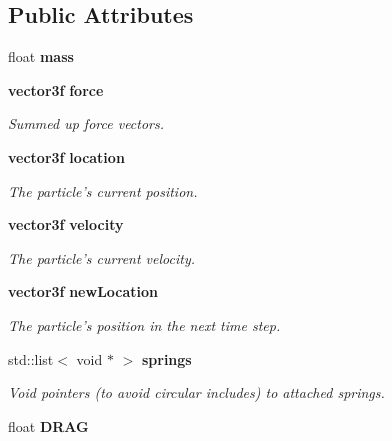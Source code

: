 \subsection*{Public Attributes}
\begin{CompactItemize}
\item 
{}
float {\bf mass}\label{classpointMass_m0}

\item 
{}
{\bf vector3f} {\bf force}\label{classpointMass_m1}

\begin{CompactList}\small\item\em Summed up force vectors.\item\end{CompactList}\item 
{}
{\bf vector3f} {\bf location}\label{classpointMass_m2}

\begin{CompactList}\small\item\em The particle's current position.\item\end{CompactList}\item 
{}
{\bf vector3f} {\bf velocity}\label{classpointMass_m3}

\begin{CompactList}\small\item\em The particle's current velocity.\item\end{CompactList}\item 
{}
{\bf vector3f} {\bf new\-Location}\label{classpointMass_m4}

\begin{CompactList}\small\item\em The particle's position in the next time step.\item\end{CompactList}\item 
{}
std::list$<$ void $\ast$ $>$ {\bf springs}\label{classpointMass_m5}

\begin{CompactList}\small\item\em Void pointers (to avoid circular includes) to attached springs.\item\end{CompactList}\item 
{}
float {\bf DRAG}\label{classpointMass_m6}

\end{CompactItemize}



